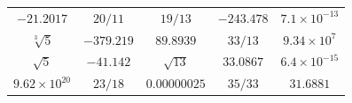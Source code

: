 \begin{tabular}{ccccc}
\toprule
$-21.2017$ & $20/11$ & $19/13$ & $-243.478$ & $7.1\times 10^{-13}$ \\
$\sqrt[3]{5}$ & $-379.219$ & $89.8939$ & $33/13$ & $9.34\times 10^{7}$ \\
$\sqrt{5}$ & $-41.142$ & $\sqrt{13}$ & $33.0867$ & $6.4\times 10^{-15}$ \\
$9.62\times 10^{20}$ & $23/18$ & $0.00000025$ & $35/33$ & $31.6881$ \\
\bottomrule
\end{tabular}

